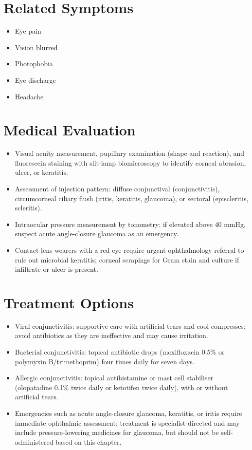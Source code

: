 \section*{Related Symptoms}
\begin{itemize}
  \item Eye pain
  \item Vision blurred
  \item Photophobia
  \item Eye discharge
  \item Headache
\end{itemize}


\section*{Medical Evaluation}
\begin{itemize}
  \item Visual acuity measurement, pupillary examination (shape and reaction), and fluorescein staining with slit-lamp biomicroscopy to identify corneal abrasion, ulcer, or keratitis.
  \item Assessment of injection pattern: diffuse conjunctival (conjunctivitis), circumcorneal ciliary flush (iritis, keratitis, glaucoma), or sectoral (episcleritis, scleritis).
  \item Intraocular pressure measurement by tonometry; if elevated above 40 mmHg, suspect acute angle-closure glaucoma as an emergency.
  \item Contact lens wearers with a red eye require urgent ophthalmology referral to rule out microbial keratitis; corneal scrapings for Gram stain and culture if infiltrate or ulcer is present.
\end{itemize}

\section*{Treatment Options}
\begin{itemize}
  \item Viral conjunctivitis: supportive care with artificial tears and cool compresses; avoid antibiotics as they are ineffective and may cause irritation.
  \item Bacterial conjunctivitis: topical antibiotic drops (moxifloxacin 0.5\% or polymyxin B/trimethoprim) four times daily for seven days.
  \item Allergic conjunctivitis: topical antihistamine or mast cell stabiliser (olopatadine 0.1\% twice daily or ketotifen twice daily), with or without artificial tears.
  \item Emergencies such as acute angle-closure glaucoma, keratitis, or iritis require immediate ophthalmic assessment; treatment is specialist-directed and may include pressure-lowering medicines for glaucoma, but should not be self-administered based on this chapter.
\end{itemize}

